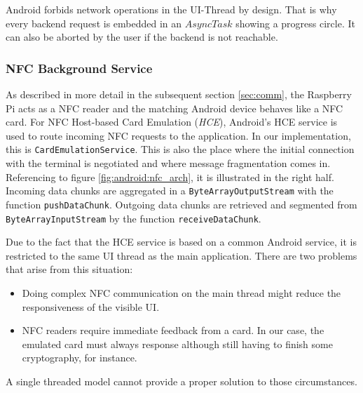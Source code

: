 Android forbids network operations in the UI-Thread by design. That is why every backend request is embedded in an $AsyncTask$ showing a progress circle. It can also be aborted by the user if the backend is not reachable.

\subsubsection{NFC Background Service}
As described in more detail in the subsequent section \ref{sec:comm}, the Raspberry Pi acts as a NFC reader and the matching Android device behaves like a NFC card.
For NFC Host-based Card Emulation (\textit{HCE}), Android's HCE service is used to route incoming NFC requests to the \app application. In our implementation, this is \texttt{CardEmulationService}.
This is also the place where the initial connection with the terminal is negotiated and where message fragmentation comes in.
Referencing to figure \ref{fig:android:nfc_arch}, it is illustrated in the right half.
Incoming data chunks are aggregated in a \texttt{ByteArrayOutputStream} with the function \texttt{pushDataChunk}.
Outgoing data chunks are retrieved and segmented from \texttt{ByteArrayInputStream} by the function \texttt{receiveDataChunk}.

%
Due to the fact that the HCE service is based on a common Android service, it is restricted to the same UI thread as the main application.
There are two problems that arise from this situation:
%
\begin{itemize}
	\item Doing complex NFC communication on the main thread might reduce the responsiveness of the visible UI.
	\item NFC readers require immediate feedback from a card. In our case, the emulated card must always response although still having to finish some cryptography, for instance.
\end{itemize}
%
A single threaded model cannot provide a proper solution to those circumstances.

